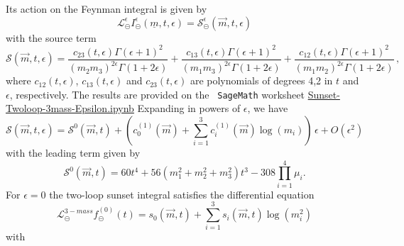 \documentclass[a4paper,12pt]{article}
\numberwithin{equation}{section}
\numberwithin{figure}{section}
\def\su{\circleddash}
\begin{document}
Its action on the Feynman integral is given by 
\begin{equation}
     \mathscr{L}^{\epsilon}_\su  I_\su^\epsilon(\underline
     m,t,\epsilon)=\mathscr{S}^\epsilon_\su(\vec m,t,\epsilon) 
   \end{equation}
   with the source term
   \begin{equation}
     \mathscr{S}(\vec m,t,\epsilon)=\frac{c_{23}(t,\epsilon)\Gamma (\epsilon +1)^2}{ (m_{2} m_{3})^{2 \epsilon}\Gamma (1+2\epsilon)}+\frac{c_{13}(t,\epsilon)\Gamma (\epsilon +1)^2}{ (m_{1} m_{3})^{2 \epsilon }\Gamma (1+2
   \epsilon)}+\frac{c_{12}(t,\epsilon)\Gamma (\epsilon +1)^2}{ (m_{1} m_{2})^{2 \epsilon }\Gamma (1+2
   \epsilon )} \, , 
\end{equation}
where $c_{12}(t,\epsilon)$, $c_{13}(t,\epsilon)$ and
$c_{23}(t,\epsilon)$ are polynomials of degrees 4,2 in $t$ and
$\epsilon$, respectively. The results are provided on the {\tt
  SageMath} worksheet \href{Sunset-Twoloop-3mass-Epsilon.ipynb}{Sunset-Twoloop-3mass-Epsilon.ipynb}
%
Expanding in powers of $\epsilon$, we have
%
\begin{equation}
    \mathscr{S}(\vec m,t,\epsilon)=\mathscr{S}^0(\vec m,t)
    +\left(c^{(1)}_0(\vec m)+
    \sum_{i=1}^3  c^{(1)}_i(\vec m)\log(m_i)\right)\,  \epsilon+O(\epsilon^2)
\end{equation}
with  the leading term given by
   \begin{equation}
   \mathscr{S}^0(\vec m,t)=60 t^{4}+56\left( m_{1}^{2}+ m_{2}^{2}+
     m_{3}^{2}\right) t^{3}
   -308 \prod_{i=1}^4 \mu_i.
 \end{equation}
For $\epsilon=0$ the two-loop sunset integral satisfies  the
differential equation~\cite{Adams:2013nia,Bloch:2016izu}
\begin{equation}
  \mathscr{L}^{3-mass}_\su f_\su^{(0)}(t)= s_0(\vec m,t)+ \sum_{i=1}^3
  s_i(\vec m,t)\log(m_i^2)  
\end{equation}
with 
\end{document}
